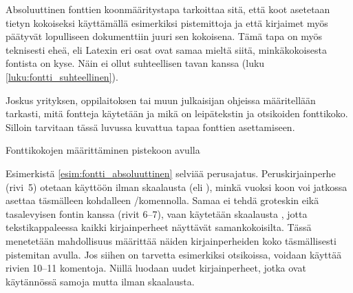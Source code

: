 Absoluuttinen fonttien koonmääritystapa tarkoittaa sitä, että koot
asetetaan tietyn kokoiseksi käyttämällä esimerkiksi pistemittoja ja että
kirjaimet myös päätyvät lopulliseen dokumenttiin juuri sen kokoisena.
Tämä tapa on myös teknisesti eheä, eli Latexin eri osat ovat samaa
mieltä siitä, minkäkokoisesta fontista on kyse. Näin ei ollut
suhteellisen tavan kanssa (luku \ref{luku:fontti_suhteellinen}).

Joskus yrityksen, oppilaitoksen tai muun julkaisijan ohjeissa
määritellään tarkasti, mitä fontteja käytetään ja mikä on leipätekstin
ja otsikoiden fonttikoko. Silloin tarvitaan tässä luvussa kuvattua tapaa
fonttien asettamiseen.

\begin{esimerkki*}
\caption{Fonttikokojen määrittäminen pistekoon avulla}
\label{esim:fontti_absoluuttinen}
\end{esimerkki*}

Esimerkistä \ref{esim:fontti_absoluuttinen} selviää perus\-ajatus.
Peruskirjainperhe (rivi~5) otetaan käyttöön ilman skaalausta (eli
), minkä vuoksi koon voi jatkossa asettaa täsmälleen
kohdalleen \-/komennolla. Samaa ei tehdä groteskin
eikä tasalevyisen fontin kanssa (rivit 6--7), vaan käytetään skaalausta
, jotta tekstikappaleessa kaikki kirjainperheet
näyttävät samankokoisilta. Tässä menetetään mahdollisuus määrittää
näiden kirjainperheiden koko täsmällisesti pistemitan avulla. Jos siihen
on tarvetta esimerkiksi otsikoissa, voidaan käyttää rivien 10--11
komentoja. Niillä luodaan uudet kirjainperheet, jotka ovat käytännössä
samoja mutta ilman skaalausta.

